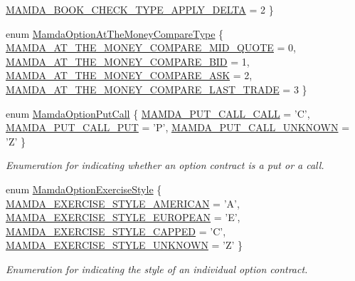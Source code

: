 \begin{CompactItemize}
\hyperlink{namespaceWombat_6f15e7af875f3469c5fb0afe58b21667f20155ccffb8c0ddaecdf1f2d6b84c0c}{MAMDA\_\-BOOK\_\-CHECK\_\-TYPE\_\-APPLY\_\-DELTA} =  2
 \}
\item 
enum \hyperlink{namespaceWombat_a07b06a78fb02e1f93ee37a2d944c33a}{Mamda\-Option\-At\-The\-Money\-Compare\-Type} \{ \hyperlink{namespaceWombat_a07b06a78fb02e1f93ee37a2d944c33aaa7f9334d6118e73e181ee3f1a7b1ef4}{MAMDA\_\-AT\_\-THE\_\-MONEY\_\-COMPARE\_\-MID\_\-QUOTE} =  0, 
\hyperlink{namespaceWombat_a07b06a78fb02e1f93ee37a2d944c33ab0d4c390097fee695a15a9584fa3fe6b}{MAMDA\_\-AT\_\-THE\_\-MONEY\_\-COMPARE\_\-BID} =  1, 
\hyperlink{namespaceWombat_a07b06a78fb02e1f93ee37a2d944c33ac222db1512f54f998fb6436ffdadbb7e}{MAMDA\_\-AT\_\-THE\_\-MONEY\_\-COMPARE\_\-ASK} =  2, 
\hyperlink{namespaceWombat_a07b06a78fb02e1f93ee37a2d944c33a44487385ab0d3f2204802e11f9e2c286}{MAMDA\_\-AT\_\-THE\_\-MONEY\_\-COMPARE\_\-LAST\_\-TRADE} =  3
 \}
\item 
enum \hyperlink{namespaceWombat_ceb2ef77ec6c36b48ef57d2887d6ac49}{Mamda\-Option\-Put\-Call} \{ \hyperlink{namespaceWombat_ceb2ef77ec6c36b48ef57d2887d6ac490e26ea7c6f2a967bdeabc020fcbcf2c8}{MAMDA\_\-PUT\_\-CALL\_\-CALL} =  'C', 
\hyperlink{namespaceWombat_ceb2ef77ec6c36b48ef57d2887d6ac490f3c07554ed87be22f6262031a3ce9a7}{MAMDA\_\-PUT\_\-CALL\_\-PUT} =  'P', 
\hyperlink{namespaceWombat_ceb2ef77ec6c36b48ef57d2887d6ac499ef88bd637ab21dfa5645777973e30df}{MAMDA\_\-PUT\_\-CALL\_\-UNKNOWN} =  'Z'
 \}
\begin{CompactList}\small\item\em Enumeration for indicating whether an option contract is a put or a call. \item\end{CompactList}\item 
enum \hyperlink{namespaceWombat_e7be5722df9d72164d322f2b72cf8d1a}{Mamda\-Option\-Exercise\-Style} \{ \hyperlink{namespaceWombat_e7be5722df9d72164d322f2b72cf8d1a8b982ea2d61b7207212047324ff29daf}{MAMDA\_\-EXERCISE\_\-STYLE\_\-AMERICAN} =  'A', 
\hyperlink{namespaceWombat_e7be5722df9d72164d322f2b72cf8d1a29dd1dc251985bf56f108583a9be2676}{MAMDA\_\-EXERCISE\_\-STYLE\_\-EUROPEAN} =  'E', 
\hyperlink{namespaceWombat_e7be5722df9d72164d322f2b72cf8d1a9dfa0e6b7b1f7bb195d6c7fe4956b60a}{MAMDA\_\-EXERCISE\_\-STYLE\_\-CAPPED} =  'C', 
\hyperlink{namespaceWombat_e7be5722df9d72164d322f2b72cf8d1aac22905b16e881af84b6446e017e6c27}{MAMDA\_\-EXERCISE\_\-STYLE\_\-UNKNOWN} =  'Z'
 \}
\begin{CompactList}\small\item\em Enumeration for indicating the style of an individual option contract. \item\end{CompactList}\item 

\end{CompactItemize}
